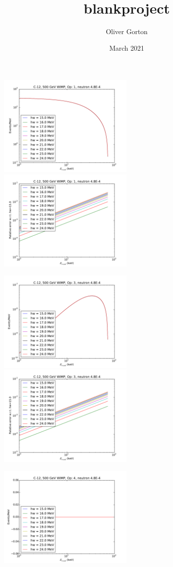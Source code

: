 \documentclass{article}
\title{blankproject}
\author{Oliver Gorton}
\date{March 2021}
\begin{document}
\includegraphics[width=0.5\textwidth]{c12-hw-o1}
\includegraphics[width=0.5\textwidth]{c12-hw-o1-relerr}

\includegraphics[width=0.5\textwidth]{c12-hw-o3}
\includegraphics[width=0.5\textwidth]{c12-hw-o3-relerr}

\includegraphics[width=0.5\textwidth]{c12-hw-o4}
\end{document}
